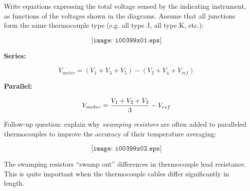 

Write equations expressing the total voltage sensed by the indicating instrument, as functions of the voltages shown in the diagrams.  Assume that all junctions form the same thermocouple type (e.g. all type J, all type K, etc.):

$$\texttt{[image: i00399x01.eps]}$$







\noindent
{\bf Series:}

$$V_{meter} = (V_1 + V_3 + V_5) - (V_2 + V_4 + V_{ref})$$

\vskip 10pt

\noindent
{\bf Parallel:}

$$V_{meter} = {{V_1 + V_2 + V_3} \over 3} - V_{ref}$$

\vskip 10pt

Follow-up question: explain why {\it swamping resistors} are often added to paralleled thermocouples to improve the accuracy of their temperature averaging:

$$\texttt{[image: i00399x02.eps]}$$







The swamping resistors ``swamp out'' differences in thermocouple lead resistance.  This is quite important when the thermocouple cables differ significantly in length.





